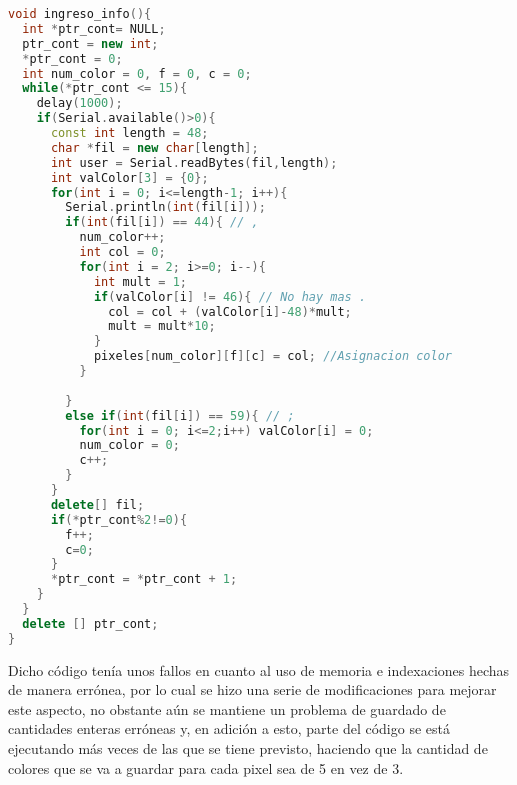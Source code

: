 \documentclass{article}
\begin{document}
\begin{lstlisting}[language=C++, label=prueba_ingresotxtymanualgeneraltink]
void ingreso_info(){
  int *ptr_cont= NULL;
  ptr_cont = new int;
  *ptr_cont = 0;
  int num_color = 0, f = 0, c = 0;
  while(*ptr_cont <= 15){
    delay(1000);
    if(Serial.available()>0){
      const int length = 48;
      char *fil = new char[length];
      int user = Serial.readBytes(fil,length);
      int valColor[3] = {0};
      for(int i = 0; i<=length-1; i++){
        Serial.println(int(fil[i]));
        if(int(fil[i]) == 44){ // ,
          num_color++;
          int col = 0;
          for(int i = 2; i>=0; i--){
            int mult = 1;
            if(valColor[i] != 46){ // No hay mas .
              col = col + (valColor[i]-48)*mult;
              mult = mult*10;
            }
            pixeles[num_color][f][c] = col; //Asignacion color
          }
          
        }
        else if(int(fil[i]) == 59){ // ;
          for(int i = 0; i<=2;i++) valColor[i] = 0;
          num_color = 0;
          c++;
        }
      }
      delete[] fil;
      if(*ptr_cont%2!=0){
        f++;
        c=0;
      }
      *ptr_cont = *ptr_cont + 1;
    }
  }
  delete [] ptr_cont;
}
\end{lstlisting}
Dicho código tenía unos fallos en cuanto al uso de memoria e indexaciones hechas de manera errónea, por lo cual se hizo una serie de modificaciones para mejorar este aspecto, no obstante aún se mantiene un problema de guardado de cantidades enteras erróneas y, en adición a esto, parte del código se está ejecutando más veces de las que se tiene previsto, haciendo que la cantidad de colores que se va a guardar para cada pixel sea de 5 en vez de 3.
\end{document}
